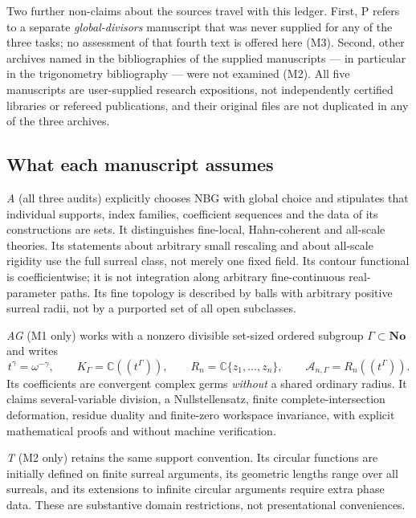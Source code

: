 \documentclass[11pt,letterpaper]{article}
\numberwithin{equation}{section}
\theoremstyle{definition}
\theoremstyle{remark}
\newcommand{\No}{\mathbf{No}}
\newcommand{\C}{\mathbb C}
\newcommand{\Ag}{\mathscr A}
\begin{document}
Two further non-claims about the sources travel with this ledger. First, P
refers to a separate \emph{global-divisors} manuscript that was never supplied
for any of the three tasks; no assessment of that fourth text is offered here
(M3). Second, other archives named in the bibliographies of the supplied
manuscripts --- in particular in the trigonometry bibliography --- were not
examined (M2). All five manuscripts are user-supplied research expositions, not
independently certified libraries or refereed publications, and their original
files are not duplicated in any of the three archives.

\subsection{What each manuscript assumes}
\label{found:sub:assumptions}
\emph{A} (all three audits) explicitly chooses NBG with global choice and
stipulates that individual supports, index families, coefficient sequences and
the data of its constructions are sets. It distinguishes fine-local,
Hahn-coherent and all-scale theories. Its statements about arbitrary small
rescaling and about all-scale rigidity use the full surreal class, not merely
one fixed field. Its contour functional is coefficientwise; it is not
integration along arbitrary fine-continuous real-parameter paths. Its fine
topology is described by balls with arbitrary positive surreal radii, not by a
purported set of all open subclasses.

\emph{AG} (M1 only) works with a nonzero divisible set-sized ordered subgroup
$\Gamma\subset\No$ and writes
\begin{equation}\label{found:eq:workspaces}
 t^\gamma=\omega^{-\gamma},\qquad
 K_\Gamma=\C((t^\Gamma)),\qquad
 R_n=\C\{z_1,\ldots,z_n\},\qquad
 \Ag_{n,\Gamma}=R_n((t^\Gamma)).
\end{equation}
Its coefficients are convergent complex germs \emph{without} a shared ordinary
radius. It claims several-variable division, a Nullstellensatz, finite
complete-intersection deformation, residue duality and finite-zero workspace
invariance, with explicit mathematical proofs and without machine verification.

\emph{T} (M2 only) retains the same support convention. Its circular functions
are initially defined on finite surreal arguments, its geometric lengths range
over all surreals, and its extensions to infinite circular arguments require
extra phase data. These are substantive domain restrictions, not presentational
conveniences.
\end{document}
